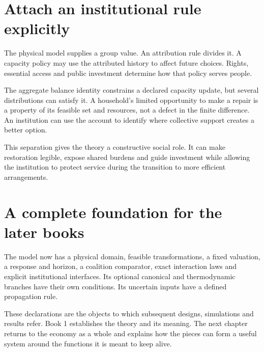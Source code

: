 \section{Attach an institutional rule explicitly}
The physical model supplies a group value. An attribution rule divides it. A capacity policy may use the attributed history to affect future choices. Rights, essential access and public investment determine how that policy serves people.

The aggregate balance identity constrains a declared capacity update, but several distributions can satisfy it. A household's limited opportunity to make a repair is a property of its feasible set and resources, not a defect in the finite difference. An institution can use the account to identify where collective support creates a better option.

This separation gives the theory a constructive social role. It can make restoration legible, expose shared burdens and guide investment while allowing the institution to protect service during the transition to more efficient arrangements.

\section{A complete foundation for the later books}
The model now has a physical domain, feasible transformations, a fixed valuation, a response and horizon, a coalition comparator, exact interaction laws and explicit institutional interfaces. Its optional canonical and thermodynamic branches have their own conditions. Its uncertain inputs have a defined propagation rule.

These declarations are the objects to which subsequent designs, simulations and results refer. Book 1 establishes the theory and its meaning. The next chapter returns to the economy as a whole and explains how the pieces can form a useful system around the functions it is meant to keep alive.
